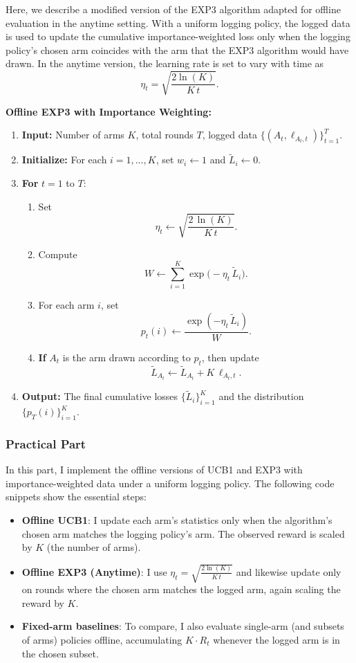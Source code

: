 Here, we describe a modified version of the EXP3 algorithm adapted for offline evaluation in the anytime setting. With a uniform logging policy, the logged data is used to update the cumulative importance-weighted loss only when the logging policy's chosen arm coincides with the arm that the EXP3 algorithm would have drawn. In the anytime version, the learning rate is set to vary with time as 
\[
\eta_t = \sqrt{\frac{2\ln(K)}{K\,t}}.
\]

\textbf{Offline EXP3 with Importance Weighting:}
\begin{enumerate}
  \item \textbf{Input:} Number of arms $K$, total rounds $T$, logged data $\{(A_t,\ell_{A_t,t})\}_{t=1}^T$.
  \item \textbf{Initialize:} For each $i=1,\dots,K$, set $w_i \leftarrow 1$ and $\tilde{L}_i \leftarrow 0$.
  \item \textbf{For} $t = 1$ to $T$:
    \begin{enumerate}
      \item Set 
      \[
      \eta_t \leftarrow \sqrt{\frac{2\,\ln(K)}{K\,t}}.
      \]
      \item Compute 
      \[
      W \leftarrow \sum_{i=1}^K \exp\bigl(-\eta_t\,\tilde{L}_i\bigr).
      \]
      \item For each arm $i$, set 
      \[
      p_t(i) \leftarrow \frac{\exp(-\eta_t\,\tilde{L}_i)}{W}.
      \]
      \item \textbf{If} $A_t$ is the arm drawn according to $p_t$, then update 
      \[
      \tilde{L}_{A_t} \leftarrow \tilde{L}_{A_t} + K\,\ell_{A_t,t}.
      \]
    \end{enumerate}
  \item \textbf{Output:} The final cumulative losses $\{\tilde{L}_i\}_{i=1}^K$ and the distribution $\{p_T(i)\}_{i=1}^K$.
\end{enumerate}

\subsubsection{Practical Part}

In this part, I implement the offline versions of UCB1 and EXP3 with importance-weighted data under a uniform logging policy. The following code snippets show the essential steps:

\begin{itemize}
  \item \textbf{Offline UCB1}: I update each arm's statistics only when the algorithm's chosen arm matches the logging policy's arm. The observed reward is scaled by $K$ (the number of arms).
  \item \textbf{Offline EXP3 (Anytime)}: I use $\eta_t = \sqrt{\tfrac{2\ln(K)}{K\,t}}$ and likewise update only on rounds where the chosen arm matches the logged arm, again scaling the reward by $K$.
  \item \textbf{Fixed-arm baselines}: To compare, I also evaluate single-arm (and subsets of arms) policies offline, accumulating $K \cdot R_t$ whenever the logged arm is in the chosen subset.
\end{itemize}

